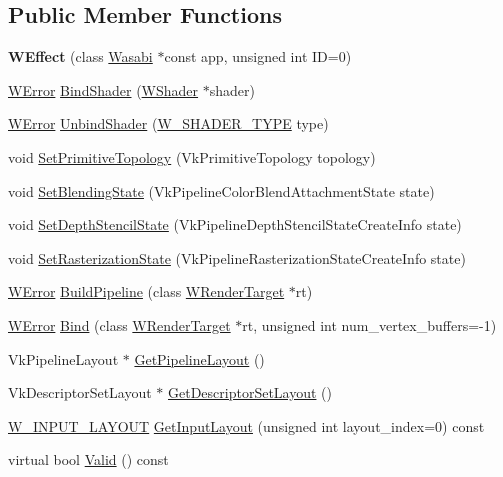 \subsection*{Public Member Functions}
\begin{DoxyCompactItemize}
\item 
{\bfseries W\+Effect} (class \hyperlink{class_wasabi}{Wasabi} $\ast$const app, unsigned int ID=0)\hypertarget{class_w_effect_addcce5db6fcd74630a19bb8a849aac8b}{}\label{class_w_effect_addcce5db6fcd74630a19bb8a849aac8b}

\item 
\hyperlink{class_w_error}{W\+Error} \hyperlink{class_w_effect_a8d10167b5c583f2407024c442c1f3b1f}{Bind\+Shader} (\hyperlink{class_w_shader}{W\+Shader} $\ast$shader)
\item 
\hyperlink{class_w_error}{W\+Error} \hyperlink{class_w_effect_ad176b710ed263f887115fa5221e261ac}{Unbind\+Shader} (\hyperlink{group__engineclass_ga8a79e4a3a441c88450e176150102c7b7}{W\+\_\+\+S\+H\+A\+D\+E\+R\+\_\+\+T\+Y\+PE} type)
\item 
void \hyperlink{class_w_effect_a98c52a678d4327226858f15b28a9c0b4}{Set\+Primitive\+Topology} (Vk\+Primitive\+Topology topology)
\item 
void \hyperlink{class_w_effect_a27b3931516c6099f074bc1fb6d224c59}{Set\+Blending\+State} (Vk\+Pipeline\+Color\+Blend\+Attachment\+State state)
\item 
void \hyperlink{class_w_effect_ab8c15d5f415d978e21328c3e06b74bdd}{Set\+Depth\+Stencil\+State} (Vk\+Pipeline\+Depth\+Stencil\+State\+Create\+Info state)
\item 
void \hyperlink{class_w_effect_a03de477bc7c26690a39e7750ac36a958}{Set\+Rasterization\+State} (Vk\+Pipeline\+Rasterization\+State\+Create\+Info state)
\item 
\hyperlink{class_w_error}{W\+Error} \hyperlink{class_w_effect_a3a23db5f72658be47397a877552a78fd}{Build\+Pipeline} (class \hyperlink{class_w_render_target}{W\+Render\+Target} $\ast$rt)
\item 
\hyperlink{class_w_error}{W\+Error} \hyperlink{class_w_effect_a5a509abbadaeb121acdb0e6dd4ff1ece}{Bind} (class \hyperlink{class_w_render_target}{W\+Render\+Target} $\ast$rt, unsigned int num\+\_\+vertex\+\_\+buffers=-\/1)
\item 
Vk\+Pipeline\+Layout $\ast$ \hyperlink{class_w_effect_aab781ff42dd7a883eeacf480d7bf6d70}{Get\+Pipeline\+Layout} ()
\item 
Vk\+Descriptor\+Set\+Layout $\ast$ \hyperlink{class_w_effect_a6d39025e7c628d8613d7239d87fa1379}{Get\+Descriptor\+Set\+Layout} ()
\item 
\hyperlink{struct_w___i_n_p_u_t___l_a_y_o_u_t}{W\+\_\+\+I\+N\+P\+U\+T\+\_\+\+L\+A\+Y\+O\+UT} \hyperlink{class_w_effect_a5cbd6275cd4cc982ef52a99a9e52a02b}{Get\+Input\+Layout} (unsigned int layout\+\_\+index=0) const 
\item 
virtual bool \hyperlink{class_w_effect_adc72bd6b182485f26e2e566914419224}{Valid} () const 
\end{DoxyCompactItemize}
